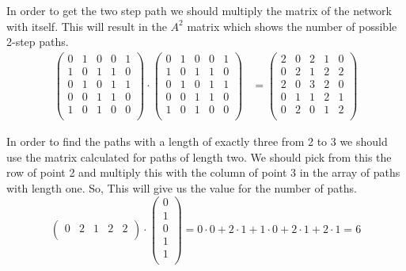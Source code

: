 \documentclass[a4paper]{article}
\begin{document}
In order to get the two step path we should multiply the matrix of the network with itself. This will result in the $A^2$ matrix which shows the number of possible 2-step paths.
\begin{align*}
\left(
\begin{array}{ccccc}
0 & 1 & 0 & 0 & 1 \\
1 & 0 & 1 & 1 & 0 \\
0 & 1 & 0 & 1 & 1 \\
0 & 0 & 1 & 1 & 0 \\
1 & 0 & 1 & 0 & 0 \\
\end{array}
\right)
\cdot
\left(
\begin{array}{ccccc}
0 & 1 & 0 & 0 & 1 \\
1 & 0 & 1 & 1 & 0 \\
0 & 1 & 0 & 1 & 1 \\
0 & 0 & 1 & 1 & 0 \\
1 & 0 & 1 & 0 & 0 \\
\end{array}
\right)
&=
\left(
\begin{array}{ccccc}
2 & 0 & 2 & 1 & 0 \\
0 & 2 & 1 & 2 & 2 \\
2 & 0 & 3 & 2 & 0 \\
0 & 1 & 1 & 2 & 1 \\
0 & 2 & 0 & 1 & 2 \\
\end{array}
\right)
\end{align*}

In order to find the paths with a length of exactly three from 2 to 3 we should use the matrix calculated for paths of length two. We should pick from this the row of point 2 and multiply this with the column of point 3 in the array of paths with length one. So, This will give us the value for the number of paths.
\[
\left(
\begin{array}{ccccc}
0 & 2 & 1 & 2 & 2 \\
\end{array}
\right)
\cdot
\left(
\begin{array}{c}
0 \\
1 \\
0 \\
1 \\
1 \\
\end{array}
\right)
=
0 \cdot 0 + 2 \cdot 1 + 1 \cdot 0 + 2 \cdot 1 + 2 \cdot 1 = 6
\]
\end{document}
